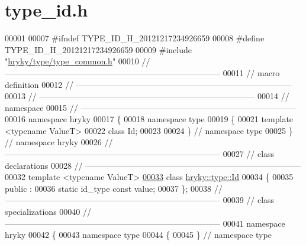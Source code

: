 \hypertarget{type__id_8h_source}{\section{type\-\_\-id.\-h}
}

\begin{DoxyCode}
00001 
00007 \textcolor{preprocessor}{#ifndef TYPE\_ID\_H\_20121217234926659}
00008 \textcolor{preprocessor}{}\textcolor{preprocessor}{#define TYPE\_ID\_H\_20121217234926659}
00009 \textcolor{preprocessor}{}\textcolor{preprocessor}{#include "\hyperlink{type__common_8h}{hryky/type/type_common.h}"}
00010 \textcolor{comment}{//
      ------------------------------------------------------------------------------}
00011 \textcolor{comment}{// macro definition}
00012 \textcolor{comment}{//
      ------------------------------------------------------------------------------}
00013 \textcolor{comment}{//
      ------------------------------------------------------------------------------}
00014 \textcolor{comment}{// namespace}
00015 \textcolor{comment}{//
      ------------------------------------------------------------------------------}
00016 \textcolor{keyword}{namespace }hryky
00017 \{
00018 \textcolor{keyword}{namespace }type
00019 \{
00021     \textcolor{keyword}{template} <\textcolor{keyword}{typename} ValueT>
00022     \textcolor{keyword}{class }Id;
00023 
00024 \} \textcolor{comment}{// namespace type}
00025 \} \textcolor{comment}{// namespace hryky}
00026 \textcolor{comment}{//
      ------------------------------------------------------------------------------}
00027 \textcolor{comment}{// class declarations}
00028 \textcolor{comment}{//
      ------------------------------------------------------------------------------}
00032 \textcolor{comment}{}\textcolor{keyword}{template} <\textcolor{keyword}{typename} ValueT>
\hypertarget{type__id_8h_source_l00033}{}\hyperlink{classhryky_1_1type_1_1_id}{00033} \textcolor{keyword}{class }\hyperlink{classhryky_1_1type_1_1_id}{hryky::type::Id}
00034 \{
00035 \textcolor{keyword}{public} :
00036     \textcolor{keyword}{static} id\_type \textcolor{keyword}{const} value;
00037 \};
00038 \textcolor{comment}{//
      ------------------------------------------------------------------------------}
00039 \textcolor{comment}{// class specializations}
00040 \textcolor{comment}{//
      ------------------------------------------------------------------------------}
00041 \textcolor{keyword}{namespace }hryky
00042 \{
00043 \textcolor{keyword}{namespace }type
00044 \{
00045 \} \textcolor{comment}{// namespace type}

\end{DoxyCode}

